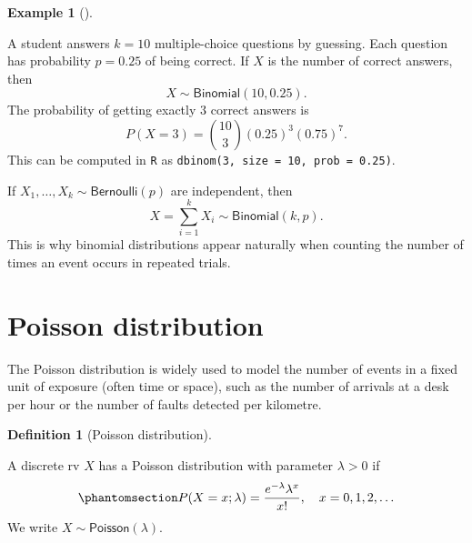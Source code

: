 \documentclass[
  a4paper,
  DIV=11,
  numbers=noendperiod,
  oneside]{scrreprt}
\theoremstyle{plain}
\theoremstyle{definition}
\newtheorem{example}{Example}[chapter]
\theoremstyle{definition}
\newtheorem{definition}{Definition}[chapter]
\theoremstyle{definition}
\theoremstyle{plain}
\theoremstyle{remark}
\begin{document}
\begin{example}[]\protect\hypertarget{exm-binomial}{}\label{exm-binomial}

A student answers \(k=10\) multiple-choice questions by guessing. Each
question has probability \(p=0.25\) of being correct. If \(X\) is the
number of correct answers, then \[
X \sim \mathsf{Binomial}(10, 0.25).
\] The probability of getting exactly \(3\) correct answers is \[
P(X=3) = \binom{10}{3}(0.25)^3(0.75)^7.
\] This can be computed in \texttt{R} as
\texttt{dbinom(3,\ size\ =\ 10,\ prob\ =\ 0.25)}.

\end{example}

\begin{tcolorbox}[enhanced jigsaw, toprule=.15mm, colbacktitle=quarto-callout-tip-color!10!white, breakable, toptitle=1mm, title=\textcolor{quarto-callout-tip-color}{\faLightbulb}\hspace{0.5em}{Binomial counts are sums of Bernoulli trials}, left=2mm, leftrule=.75mm, colback=white, colframe=quarto-callout-tip-color-frame, coltitle=black, opacitybacktitle=0.6, rightrule=.15mm, titlerule=0mm, bottomrule=.15mm, bottomtitle=1mm, arc=.35mm, opacityback=0]

If \(X_1,\dots,X_k \sim \mathsf{Bernoulli}(p)\) are independent, then \[
X = \sum_{i=1}^k X_i \sim \mathsf{Binomial}(k,p).
\] This is why binomial distributions appear naturally when counting the
number of times an event occurs in repeated trials.

\end{tcolorbox}

\section{Poisson distribution}\label{sec-poisson-distribution}

The Poisson distribution is widely used to model the number of events in
a fixed unit of exposure (often time or space), such as the number of
arrivals at a desk per hour or the number of faults detected per
kilometre.

\begin{definition}[Poisson
distribution]\protect\hypertarget{def-poisson-dist}{}\label{def-poisson-dist}

A discrete rv \(X\) has a Poisson distribution with parameter
\(\lambda > 0\) if
\begin{equation}\phantomsection\label{eq-poisson-pmf}{
P(X=x; \lambda) = \frac{e^{-\lambda}\lambda^x}{x!}, \quad x = 0,1,2,\dots
}\end{equation} We write \(X \sim \mathsf{Poisson}(\lambda)\).

\end{definition}
\end{document}
